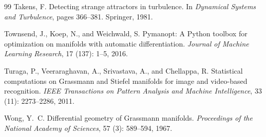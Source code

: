 \documentclass[11pt,a4paper]{article}
\begin{document}
\begin{thebibliography}{99}
Takens, F.
\newblock Detecting strange attractors in turbulence.
\newblock In \emph{Dynamical Systems and Turbulence}, pages 366--381. Springer, 1981.

Townsend, J., Koep, N., and Weichwald, S.
\newblock Pymanopt: A Python toolbox for optimization on manifolds with automatic differentiation.
\newblock \emph{Journal of Machine Learning Research}, 17 (137): 1--5, 2016.

Turaga, P., Veeraraghavan, A., Srivastava, A., and Chellappa, R.
\newblock Statistical computations on Grassmann and Stiefel manifolds for image and video-based recognition.
\newblock \emph{IEEE Transactions on Pattern Analysis and Machine Intelligence}, 33 (11): 2273--2286, 2011.

Wong, Y.~C.
\newblock Differential geometry of Grassmann manifolds.
\newblock \emph{Proceedings of the National Academy of Sciences}, 57 (3): 589--594, 1967.

\end{thebibliography}
\end{document}
